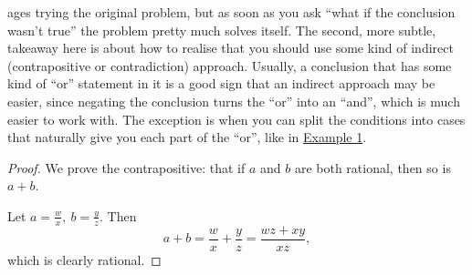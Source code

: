 \documentclass{amsart}
\begin{document}
ages trying the original problem, but as soon as you ask ``what if the conclusion
wasn't true'' the problem pretty much solves itself. The second, more subtle,
takeaway here is about how to realise that you should use some kind of indirect
(contrapositive or contradiction) approach. Usually, a conclusion that has some
kind of ``or'' statement in it is a good sign that an indirect approach may be
easier, since negating the conclusion turns the ``or'' into an ``and'', which is
much easier to work with. The exception is when you can split the conditions
into cases that naturally give you each part of the ``or'', like in
\hyperlink{p:1:1:1}{Example 1}.
\begin{proof}
  We prove the contrapositive: that if $a$ and $b$ are both rational, then so is
  $a+b$.

  Let $a=\frac wx,\ b=\frac yz$. Then \[a+b=\frac wx+\frac
  yz=\frac{wz+xy}{xz},\] which is clearly rational.
\end{proof}
\end{document}
